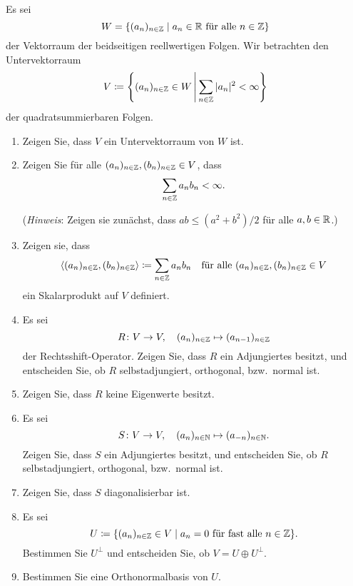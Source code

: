\documentclass[a4paper,10pt]{scrartcl}
\begin{document}
\begin{question}
  Es sei
  \[
    W = \{(a_n)_{n \in \mathbb{Z}} \mid \text{$a_n \in \mathbb{R}$ für alle $n \in \mathbb{Z}$}\}
  \]
  der Vektorraum der beidseitigen reellwertigen Folgen.
  Wir betrachten den Untervektorraum
  \[
    V \coloneqq
    \left\{
      (a_n)_{n \in \mathbb{Z}} \in W
    \,\middle|\,
      \sum_{n \in \mathbb{Z}} |a_n|^2 < \infty
   \right\}
  \]
  der quadratsummierbaren Folgen.
  \begin{enumerate}[leftmargin=*]
    \item
      Zeigen Sie, dass $V$ ein Untervektorraum von $W$ ist.
    \item
      Zeigen Sie für alle $(a_n)_{n \in \mathbb{Z}}, (b_n)_{n \in \mathbb{Z}} \in V$, dass
      \[
        \sum_{n \in \mathbb{Z}} a_n b_n < \infty.
      \]
      
      (\emph{Hinweis}:
       Zeigen sie zunächst, dass $ab \leq (a^2 + b^2)/2$ für alle $a, b \in \mathbb{R}$.)
    \item
      Zeigen sie, dass
      \[
                  \langle  (a_n)_{n \in \mathbb{Z}}, (b_n)_{n \in \mathbb{Z}}  \rangle
        \coloneqq \sum_{n \in \mathbb{Z}} a_n b_n
        \quad
        \text{für alle $(a_n)_{n \in \mathbb{Z}}, (b_n)_{n \in \mathbb{Z}} \in V$}
      \]
      ein Skalarprodukt auf $V$ definiert.
    \item
      Es sei
      \[
        R \colon V \to V,
        \quad
        (a_n)_{n \in \mathbb{Z}} \mapsto (a_{n-1})_{n \in \mathbb{Z}}
      \]
      der Rechtsshift-Operator.
      Zeigen Sie, dass $R$ ein Adjungiertes besitzt, und entscheiden Sie, ob $R$ selbstadjungiert, orthogonal, bzw.\ normal ist.
    \item
      Zeigen Sie, dass $R$ keine Eigenwerte besitzt.
    \item
      Es sei
      \[
        S \colon V \to V,
        \quad
        (a_n)_{n \in \mathbb{N}} \mapsto (a_{-n})_{n \in \mathbb{N}}.
      \]
      Zeigen Sie, dass $S$ ein Adjungiertes besitzt, und entscheiden Sie, ob $R$ selbstadjungiert, orthogonal, bzw.\ normal ist.
    \item
      Zeigen Sie, dass $S$ diagonalisierbar ist.
    \item
      Es sei
      \[
        U \coloneqq \{(a_n)_{n \in \mathbb{Z}} \in V \mid \text{$a_n = 0$ für fast alle $n \in \mathbb{Z}$}\}.
      \]
      Bestimmen Sie $U^\perp$ und entscheiden Sie, ob $V = U \oplus U^\perp$.
    \item
      Bestimmen Sie eine Orthonormalbasis von $U$.
  \end{enumerate}
\end{question}
\end{document}
